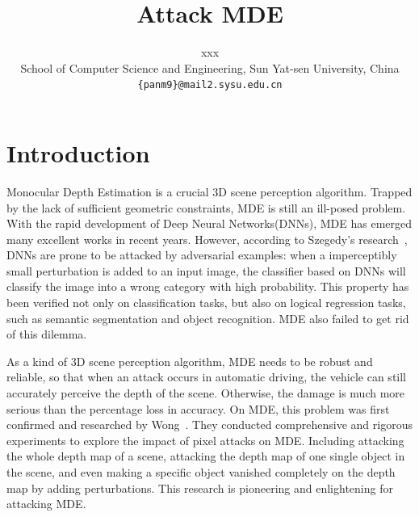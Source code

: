 \documentclass[10pt,twocolumn,letterpaper]{article}
\begin{document}
\title{Attack MDE}

\author{xxx
\\ School of Computer Science and Engineering, 
Sun Yat-sen University, China\\{\tt\small \{panm9\}@mail2.sysu.edu.cn}}

\maketitle

\begin{abstract}
\end{abstract}

\section{Introduction}
Monocular Depth Estimation is a crucial 3D scene perception algorithm. 
Trapped by the lack of sufficient geometric constraints, 
MDE is still an ill-posed problem. With the rapid development of 
Deep Neural Networks(DNNs), MDE has emerged many excellent works 
in recent years. However, according to Szegedy's 
research~\cite{Szegedy_2014_ICLR}, DNNs are 
prone to be attacked by adversarial examples: when a imperceptibly 
small perturbation is added to an input image, the classifier 
based on DNNs will classify the image into a wrong category with high probability. 
This property has been verified not only on classification tasks, 
but also on logical regression tasks, such as semantic segmentation and 
object recognition. MDE also failed to get rid of this dilemma.

As a kind of 3D scene perception algorithm, MDE needs to be 
robust and reliable, so that when an attack occurs in automatic 
driving, the vehicle can still accurately perceive the depth 
of the scene. Otherwise, the damage is much more serious than 
the percentage loss in accuracy. On MDE, this problem was 
first confirmed and researched by Wong~\cite{Wong_2020_NIPS}. 
They conducted 
comprehensive and rigorous experiments to explore the impact 
of pixel attacks on MDE. Including attacking the whole 
depth map of a scene, attacking the depth map of one 
single object in the scene, and even making a specific 
object vanished completely on the depth map by 
adding perturbations. This research is pioneering and 
enlightening for attacking MDE.
\end{document}

